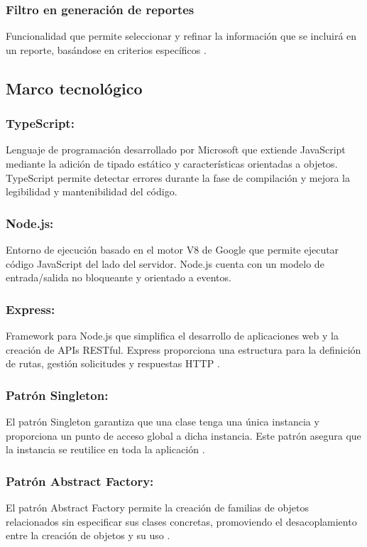 \documentclass[spanish]{ieee_upb}
\begin{document}
  \subsubsection{Filtro en generación de reportes} Funcionalidad que permite seleccionar y refinar la información que se incluirá en un reporte, basándose en criterios específicos \cite{ibm_report_filter_2021}.
\subsection{Marco tecnológico}

    \subsubsection{TypeScript:} Lenguaje de programación desarrollado por Microsoft que extiende JavaScript mediante la adición de tipado estático y características orientadas a objetos. TypeScript permite detectar errores durante la fase de compilación y mejora la legibilidad y mantenibilidad del código\cite{typescript_2020}.
  
  \subsubsection{Node.js:} Entorno de ejecución basado en el motor V8 de Google que permite ejecutar código JavaScript del lado del servidor. Node.js cuenta con un modelo de entrada/salida no bloqueante y orientado a eventos\cite{nodejs_2020}.
  
  \subsubsection{Express:} Framework para Node.js que simplifica el desarrollo de aplicaciones web y la creación de APIs RESTful. Express proporciona una estructura para la definición de  rutas, gestión solicitudes y respuestas HTTP \cite{express_framework_2020}.

    \subsubsection{Patrón Singleton:} El patrón Singleton garantiza que una clase tenga una única instancia y proporciona un punto de acceso global a dicha instancia. Este patrón asegura que la instancia se reutilice en toda la aplicación \cite{gamma1994design}.
  
  \subsubsection{Patrón Abstract Factory:} El patrón Abstract Factory permite la creación de familias de objetos relacionados sin especificar sus clases concretas, promoviendo el desacoplamiento entre la creación de objetos y su uso \cite{gamma1994design}.
\end{document}
